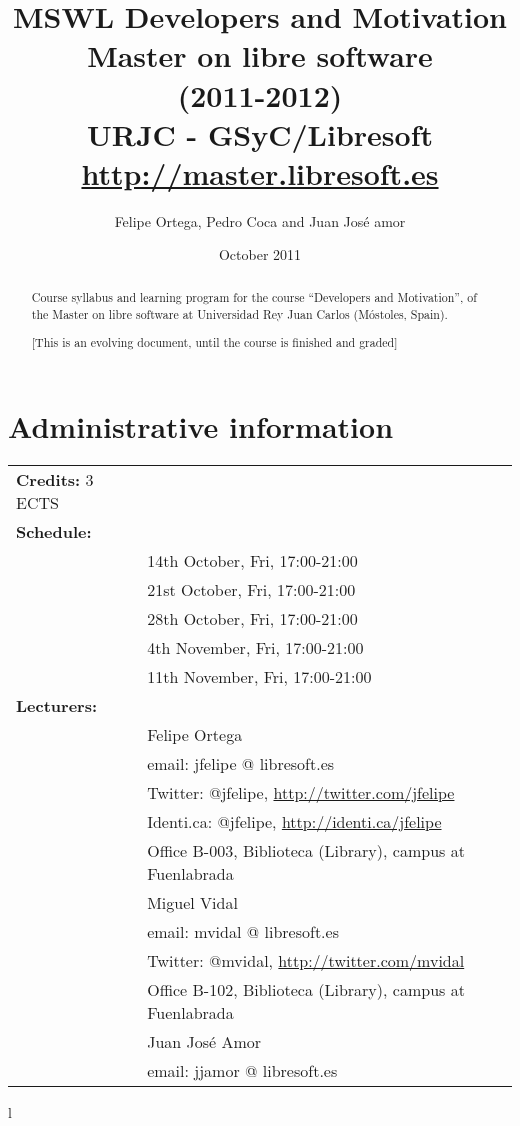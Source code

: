 \documentclass[a4paper]{article}
\title{MSWL Developers and Motivation \\
Master on libre software \\
(2011-2012) \\
URJC - GSyC/Libresoft \\
\url{http://master.libresoft.es}}
\author{Felipe Ortega, Pedro Coca and Juan José amor}
\date{October 2011}
\begin{document}
\maketitle

\begin{abstract}
Course syllabus and learning program for the course ``Developers and Motivation'', of the Master on libre software at Universidad Rey Juan Carlos (Móstoles, Spain).

[This is an evolving document, until the course is finished and graded]
\end{abstract}

\tableofcontents

\section{Administrative information}

\begin{tabular}{ll}
\textbf{Credits:} 3 ECTS \\
\textbf{Schedule:} \\
& 14th October, Fri, 17:00-21:00 \\
& 21st October, Fri, 17:00-21:00 \\
& 28th October, Fri, 17:00-21:00 \\
& 4th November, Fri, 17:00-21:00 \\
& 11th November, Fri, 17:00-21:00 \\
\textbf{Lecturers:} \\
& Felipe Ortega \\
& \hspace{1cm} email: jfelipe @ libresoft.es \\
& \hspace{1cm} Twitter: @jfelipe, \url{http://twitter.com/jfelipe} \\
& \hspace{1cm} Identi.ca: @jfelipe, \url{http://identi.ca/jfelipe} \\
& \hspace{1cm} Office B-003, Biblioteca (Library), campus at Fuenlabrada \\
& Miguel Vidal \\
& \hspace{1cm} email: mvidal @ libresoft.es \\
& \hspace{1cm} Twitter: @mvidal, \url{http://twitter.com/mvidal} \\
& \hspace{1cm} Office B-102, Biblioteca (Library), campus at Fuenlabrada \\
& Juan José Amor \\
& \hspace{1cm} email: jjamor @ libresoft.es \\
\end{tabular}{l}
\end{document}
